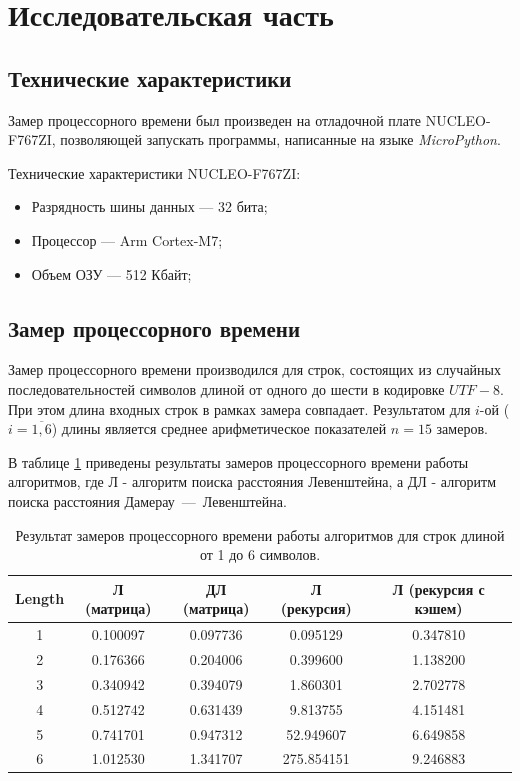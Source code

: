 \section{Исследовательская часть}

\subsection{Технические характеристики}

Замер процессорного времени был произведен на отладочной плате NUCLEO-F767ZI\cite{stm}, позволяющей запускать программы, написанные на языке \textit{MicroPython}\cite{python}.

Технические характеристики NUCLEO-F767ZI:
\begin{itemize}
    \item Разрядность шины данных --- 32 бита;
    \item Процессор --- Arm Cortex-M7;
    \item Объем ОЗУ --- 512 Кбайт;
\end{itemize}

\subsection{Замер процессорного времени}

Замер процессорного времени производился для строк, состоящих из случайных последовательностей символов длиной от одного до шести в кодировке $UTF-8$. При этом длина входных строк в рамках замера совпадает. Результатом для $i$-ой ($i=\overline{1,6}$) длины является среднее арифметическое показателей $n=15$ замеров. 

В таблице \ref{table:timings} приведены результаты замеров процессорного времени работы алгоритмов, где Л - алгоритм поиска расстояния Левенштейна, а ДЛ - алгоритм поиска расстояния Дамерау~---~Левенштейна.

\begin{table}[htb]
\caption{\centering Результат замеров процессорного времени работы алгоритмов для строк длиной от 1 до 6 символов.}
\small
\centering\begin{tabular}{|c|c|c|c|c|}
    \hline
    \textbf{Length} & \textbf{Л (матрица)} & \textbf{ДЛ (матрица)} & \textbf{Л (рекурсия)} & \textbf{Л (рекурсия с кэшем)} \\
    \hline
    1 & 0.100097 & 0.097736 & 0.095129 & 0.347810 \\
    2 & 0.176366 & 0.204006 & 0.399600 & 1.138200 \\
    3 & 0.340942 & 0.394079 & 1.860301 & 2.702778 \\
    4 & 0.512742 & 0.631439 & 9.813755 & 4.151481 \\
    5 & 0.741701 & 0.947312 & 52.949607 & 6.649858 \\
    6 & 1.012530 & 1.341707 & 275.854151 & 9.246883 \\
    \hline
\end{tabular}
\label{table:timings}
\end{table}

